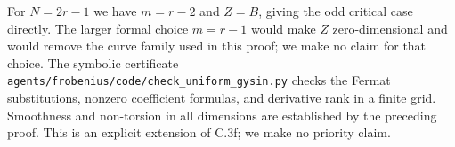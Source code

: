 For $N=2r-1$ we have $m=r-2$ and $Z=B$, giving the odd critical
case directly. The larger formal choice $m=r-1$ would make $Z$
zero-dimensional and would remove the curve family used in this
proof; we make no claim for that choice. The symbolic certificate
\texttt{agents/frobenius/code/check\_uniform\_gysin.py} checks the
Fermat substitutions, nonzero coefficient formulas, and derivative
rank in a finite grid. Smoothness and non-torsion in all dimensions
are established by the preceding proof. This is an explicit
extension of C.3f; we make no priority claim.
